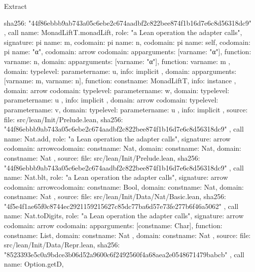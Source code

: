 \begin{lexlean}{Extract}
\begin{toolingmodule}
{{{        sha256: "44f86ebbb9ab743a05c6ebe2c674aadbf2c822bee874f1b16d7e6c8d56318dc9"
      }
    },
    call{
      name: MonadLiftT.monadLift,
      role: "a Lean operation the adapter calls",
      signature: pi{
        name: m,
        codomain: pi{
          name: n,
          codomain: pi{
            name: self,
            codomain: pi{
              name: "α",
              codomain: arrow{
                codomain: app{arguments: [var{name: "α"}], function: var{name: n}},
                domain: app{arguments: [var{name: "α"}], function: var{name: m}}
              },
              domain: type{level: parameter{name: u}},
              info: implicit
            },
            domain: app{arguments: [var{name: m}, var{name: n}], function: const{name: MonadLiftT}},
            info: instance
          },
          domain: arrow{
            codomain: type{level: parameter{name: w}},
            domain: type{level: parameter{name: u}}
          },
          info: implicit
        },
        domain: arrow{
          codomain: type{level: parameter{name: v}},
          domain: type{level: parameter{name: u}}
        },
        info: implicit
      },
      source: {
        file: src/lean/Init/Prelude.lean,
        sha256: "44f86ebbb9ab743a05c6ebe2c674aadbf2c822bee874f1b16d7e6c8d56318dc9"
      }
    },
    call{
      name: Nat.add,
      role: "a Lean operation the adapter calls",
      signature: arrow{
        codomain: arrow{codomain: const{name: Nat}, domain: const{name: Nat}},
        domain: const{name: Nat}
      },
      source: {
        file: src/lean/Init/Prelude.lean,
        sha256: "44f86ebbb9ab743a05c6ebe2c674aadbf2c822bee874f1b16d7e6c8d56318dc9"
      }
    },
    call{
      name: Nat.blt,
      role: "a Lean operation the adapter calls",
      signature: arrow{
        codomain: arrow{codomain: const{name: Bool}, domain: const{name: Nat}},
        domain: const{name: Nat}
      },
      source: {
        file: src/lean/Init/Data/Nat/Basic.lean,
        sha256: "4f5e4f1ae65f0c8744ec2921159215627c85dc77ba6d57e73fe277b6f46a5062"
      }
    },
    call{
      name: Nat.toDigits,
      role: "a Lean operation the adapter calls",
      signature: arrow{
        codomain: arrow{
          codomain: app{arguments: [const{name: Char}], function: const{name: List}},
          domain: const{name: Nat}
        },
        domain: const{name: Nat}
      },
      source: {
        file: src/lean/Init/Data/Repr.lean,
        sha256: "8523393e5c0a9bdce3b06d52a9600c6f2492560f4a68aea2e0548671479babcb"
      }
    },
    call{
      name: Option.getD,
}}
\end{toolingmodule}
\end{lexlean}
